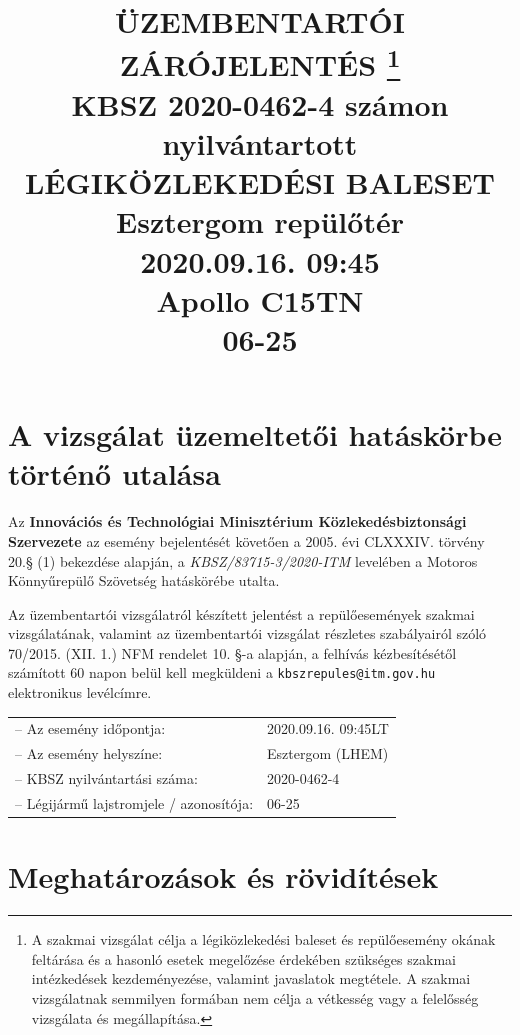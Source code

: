 \documentclass[a4paper,10pt]{article}
\title{%
    \textbf{ÜZEMBENTARTÓI ZÁRÓJELENTÉS}    \thanks{\normalsize{A szakmai vizsgálat célja a 
    		légiközlekedési baleset és repülőesemény 
    		okának feltárása és a hasonló esetek megelőzése érdekében szükséges szakmai 
    		intézkedések kezdeményezése, valamint javaslatok megtétele. A szakmai 
    		vizsgálatnak semmilyen formában nem célja a vétkesség vagy a felelősség 
    		vizsgálata és megállapítása.}} \\ %
    \vspace*{36pt}
    \textbf{KBSZ 2020-0462-4 számon nyilvántartott\\
    LÉGIKÖZLEKEDÉSI BALESET}\\
    \vspace*{24pt}
    Esztergom repülőtér\\
    \vspace*{24pt}
    2020.09.16. 09:45\\
    \vspace*{24pt}
    Apollo C15TN\\
    06-25\\
    \vspace*{5cm}
}
\author{}
\date{}
\begin{document}
\maketitle
\pagebreak
\pagestyle{fancy}
\tableofcontents
\listoffigures
\pagebreak

%

\pagebreak


\section*{A vizsgálat üzemeltetői hatáskörbe történő utalása}
Az \textbf{Innovációs és Technológiai Minisztérium Közlekedésbiztonsági 
Szervezete} az esemény bejelentését követően a 2005. évi CLXXXIV. törvény 20.§ 
(1) bekezdése alapján, a \textit{KBSZ/83715-3/2020-ITM} levelében a 
Motoros Könnyűrepülő Szövetség hatáskörébe utalta.

Az üzembentartói vizsgálatról készített jelentést a repülőesemények szakmai 
vizsgálatának, valamint az üzembentartói vizsgálat részletes szabályairól szóló 
70/2015. (XII. 1.) NFM rendelet  10. §-a alapján, a felhívás kézbesítésétől 
számított 60 napon belül kell megküldeni a \texttt{kbszrepules@itm.gov.hu} 
elektronikus levélcímre.\\

\begin{tabular}{ll}
  -- Az esemény időpontja:& 2020.09.16. 09:45LT\\
  -- Az esemény helyszíne:& Esztergom (LHEM)\\
  -- KBSZ nyilvántartási száma:& 2020-0462-4\\
  -- Légijármű lajstromjele / azonosítója:& 06-25\\
\end{tabular}

\section*{Meghatározások és rövidítések}
\end{document}
